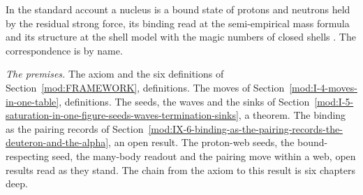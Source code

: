 \begin{chbridge}
In the standard account a nucleus is a bound state of protons and neutrons held by the residual strong force, its binding read at the semi-empirical mass formula and its structure at the shell model with the magic numbers of closed shells \cite{BetheBacher1936,Mayer1949}. The correspondence is by name.
\end{chbridge}
\begin{chproof}
\textit{The premises.} The axiom and the six definitions of Section~\ref{mod:FRAMEWORK}, definitions. The moves of Section~\ref{mod:I-4-moves-in-one-table}, definitions. The seeds, the waves and the sinks of Section~\ref{mod:I-5-saturation-in-one-figure-seeds-waves-termination-sinks}, a theorem. The binding as the pairing records of Section~\ref{mod:IX-6-binding-as-the-pairing-records-the-deuteron-and-the-alpha}, an open result. The proton-web seeds, the bound-respecting seed, the many-body readout and the pairing move within a web, open results read as they stand. The chain from the axiom to this result is six chapters deep.


\end{chproof}
